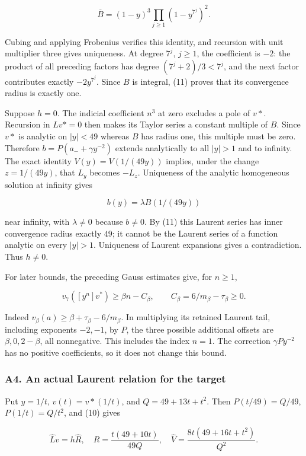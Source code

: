 \documentclass[11pt,a4paper]{article}
\begin{document}
\[
\overline B=(1-y)^3\prod_{j\ge1}(1-y^{7^j})^2.\tag{11}
\]

Cubing and applying Frobenius verifies this identity, and recursion with unit multiplier three gives uniqueness. At degree \(7^j\), \(j≥1\), the coefficient is \(-2\): the product of all preceding factors has degree \((7^j+2)/3<7^j\), and the next factor contributes exactly \(-2y^{7^j}\). Since \(B\) is integral, (11) proves that its convergence radius is exactly one.

Suppose \(h=0\). The indicial coefficient \(n^{3}\) at zero excludes a pole of \(v*\). Recursion in \(Lv*=0\) then makes its Taylor series a constant multiple of \(B\). Since \(v*\) is analytic on \(|y|<49\) whereas \(B\) has radius one, this multiple must be zero. Therefore \(b=P(a_{-}+γy^{-2})\) extends analytically to all \(|y|>1\) and to infinity. The exact identity \(V(y)=V(1/(49y))\) implies, under the change \(z=1/(49y)\), that \(L_y\) becomes \(-L_z\). Uniqueness of the analytic homogeneous solution at infinity gives

\[
b(y)=\lambda B(1/(49y))
\]

near infinity, with \(λ≠0\) because \(b≠0\). By (11) this Laurent series has inner convergence radius exactly \(49\); it cannot be the Laurent series of a function analytic on every \(|y|>1\). Uniqueness of Laurent expansions gives a contradiction. Thus \(h≠0\).

For later bounds, the preceding Gauss estimates give, for \(n≥1\),

\[
v_7([y^n]v^*)\ge\beta n-C_\beta,
\qquad C_\beta=6/m_\beta-\tau_\beta\ge0.\tag{12}
\]

Indeed \(v_β(a)≥β+τ_β-6/m_β\). In multiplying its retained Laurent tail, including exponents \(-2,-1\), by \(P\), the three possible additional offsets are \(β,0,2-β\), all nonnegative. This includes the index \(n=1\). The correction \(γPy^{-2}\) has no positive coefficients, so it does not change this bound.

\hypertarget{a4.-an-actual-laurent-relation-for-the-target}{%
\subsubsection{A4. An actual Laurent relation for the target}\label{a4.-an-actual-laurent-relation-for-the-target}}

Put \(y=1/t\), \(v(t)=v*(1/t)\), and \(Q=49+13t+t^{2}\). Then \(P(t/49)=Q/49\), \(P(1/t)=Q/t^{2}\), and (10) gives

\[
\widehat L v=h\widehat R,
\quad \widehat R=\frac{t(49+10t)}{49Q},
\quad \widehat V=\frac{8t(49+16t+t^2)}{Q^2}.
\]
\end{document}
